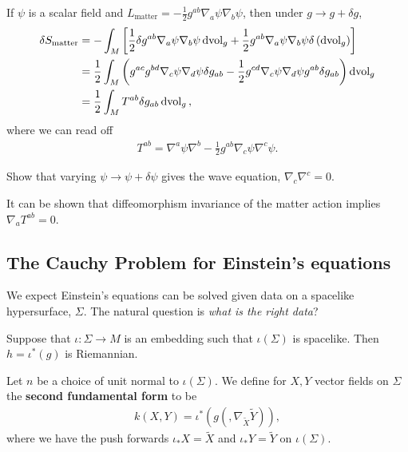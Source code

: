 \begin{example}
    If $\psi$ is a scalar field and $L_\text{matter} =-\frac{1}{2} g^{ab} \nabla_a \psi \nabla_b \psi$, then under $g \to g + \delta g$,
    \begin{align}
        \delta S_\text{matter} &= -\int_M \left[ \frac{1}{2} \delta g^{ab} \nabla_a \psi \nabla_b \psi \dd{\text{vol}}_g + \frac{1}{2} g^{ab} \nabla_a \psi \nabla_b \psi \delta \left( \dd{\text{vol}}_g \right) \right]  \\
        &= \frac{1}{2} \int_M \left( g^{ac} g^{bd} \nabla_c \psi \nabla_d \psi \delta g_{ab} -\frac{1}{2} g^{cd} \nabla_c \psi \nabla_d \psi g^{ab} \delta g_{ab}\right) \dd{\text{vol}}_g  \\
        &= \frac{1}{2} \int_M T^{ab} \delta g_{ab} \dd{\text{vol}}_g 
    ,\end{align}
    where we can read off
    \begin{align}
        T^{ab} = \nabla^{a} \psi \nabla^{b} - \frac{1}{2} g^{ab} \nabla_c \psi \nabla^{c} \psi
    .\end{align}
    \begin{exercise}
        Show that varying $\psi \to \psi + \delta \psi$ gives the wave equation, $\nabla_c \nabla^{c} = 0$.
    \end{exercise}
\end{example}

It can be shown that diffeomorphism invariance of the matter action implies $\nabla_a T^{ab} = 0$.

\subsection{The Cauchy Problem for Einstein's equations}

We expect Einstein's equations can be solved given data on a spacelike hypersurface, $\Sigma$. The natural question is \textit{what is the right data}?

Suppose that $\iota : \Sigma \to M$ is an embedding such that $\iota \left( \Sigma \right)$ is spacelike. Then $h = \iota^{*}\left( g \right) $ is Riemannian.


\begin{definition}
    Let $n$ be a choice of unit normal to $\iota \left( \Sigma \right) $. We define for $X,Y$ vector fields on $\Sigma$ the \textbf{second fundamental form} to be
    \begin{align}
        k \left( X,Y \right) = \iota^{*}\left( g \left( , \nabla_{\widetilde{X}} \widetilde{Y} \right)  \right) 
    ,\end{align}
    where we have the push forwards $\iota_* X = \widetilde{X}$ and $\iota_* Y = \widetilde{Y}$ on $\iota \left( \Sigma \right) $.
\end{definition}

